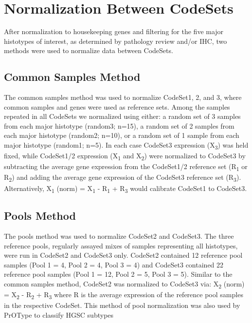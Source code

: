 \documentclass[
]{report}
\begin{document}
\hypertarget{normalization-between-codesets}{%
\section{Normalization Between CodeSets}\label{normalization-between-codesets}}

After normalization to housekeeping genes and filtering for the five major histotypes of interest, as determined by pathology review and/or IHC, two methods were used to normalize data between CodeSets.

\hypertarget{common-samples-method}{%
\subsection{Common Samples Method}\label{common-samples-method}}

The common samples method was used to normalize CodeSet1, 2, and 3, where common samples and genes were used as reference sets. Among the samples repeated in all CodeSets we normalized using either: a random set of 3 samples from each major histotype (random3; n=15), a random set of 2 samples from each major histotype (random2; n=10), or a random set of 1 sample from each major histotype (random1; n=5). In each case CodeSet3 expression (X\textsubscript{3}) was held fixed, while CodeSet1/2 expression (X\textsubscript{1} and X\textsubscript{2}) were normalized to CodeSet3 by subtracting the average gene expression from the CodeSet1/2 reference set (R\textsubscript{1} or R\textsubscript{2}) and adding the average gene expression of the CodeSet3 reference set (R\textsubscript{3}). Alternatively, X\textsubscript{1} (norm) = X\textsubscript{1} - R\textsubscript{1} + R\textsubscript{3} would calibrate CodeSet1 to CodeSet3.

\hypertarget{pools-method}{%
\subsection{Pools Method}\label{pools-method}}

The pools method was used to normalize CodeSet2 and CodeSet3. The three reference pools, regularly assayed mixes of samples representing all histotypes, were run in CodeSet2 and CodeSet3 only. CodeSet2 contained 12 reference pool samples (Pool 1 = 4, Pool 2 = 4, Pool 3 = 4) and CodeSet3 contained 22 reference pool samples (Pool 1 = 12, Pool 2 = 5, Pool 3 = 5). Similar to the common samples method, CodeSet2 was normalized to CodeSet3 via: X\textsubscript{2} (norm) = X\textsubscript{2} - R\textsubscript{2} + R\textsubscript{3} where R is the average expression of the reference pool samples in the respective CodeSet. This method of pool normalization was also used by PrOType to classify HGSC subtypes
\end{document}
